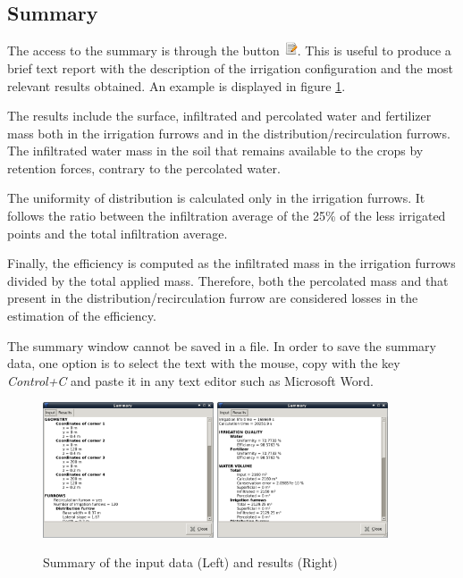 \subsection{Summary}

The access to the summary is through the button \includegraphics[height=0.4cm]{images/gtk-edit.png}. This is useful to produce a brief text report with the description of the irrigation configuration and the most relevant results obtained. An example is displayed in figure \ref{wInforme}.

The results include the surface, infiltrated and percolated water and fertilizer mass both in the irrigation furrows and in the distribution/recirculation furrows. The infiltrated water mass in the soil that remains available to the crops by retention forces, contrary to the percolated water.

The uniformity of distribution is calculated only in the irrigation furrows. It follows the ratio between the infiltration average of the 25\% of the less irrigated points and the total infiltration average.

Finally, the efficiency is computed as the infiltrated mass in the irrigation furrows divided by the total applied mass. Therefore, both the percolated mass and that present in the distribution/recirculation furrow are considered losses in the estimation of the efficiency. 

The summary window cannot be saved in a file. In order to save the summary data, one option is to select the text with the mouse, copy with the key \emph{Control+C} and paste it in any text editor such as Microsoft Word.


\begin{figure}[!h]
\begin{center}
\includegraphics[width=0.45\textwidth]{images/sumarioEN.png}
\qquad
\includegraphics[width=0.45\textwidth]{images/sumario2EN.png}
\caption{Summary of the input data (Left) and results (Right)}\label{wInforme}
\end{center}
\end{figure}


